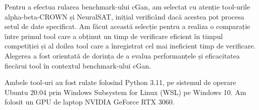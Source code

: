 \hspace{0.5 cm}
Pentru a efectua rularea benchmark-ului cGan, am selectat cu atenție tool-urile alpha-beta-CROWN și NeuralSAT, inițial verificând dacă acestea pot procesa setul de date specificat. Am făcut această selecție pentru a realiza o comparație între primul tool care a obținut un timp de verificare eficient în timpul competiției și al doilea tool care a înregistrat cel mai ineficient timp de verificare. Alegerea a fost orientată de dorința de a evalua performanțele și eficacitatea fiecărui tool în contextul benchmark-ului cGan.

Ambele tool-uri au fost rulate folosind Python 3.11,  pe sistemul de operare Ubuntu 20.04 prin Windows Subsystem for Linux (WSL) pe Windows 10. Am folosit un GPU de laptop NVIDIA GeForce RTX 3060.